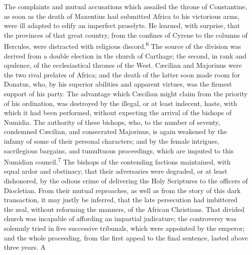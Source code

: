 

The complaints and mutual accusations which assailed the throne
of Constantine, as soon as the death of Maxentius had submitted
Africa to his victorious arms, were ill adapted to edify an
imperfect proselyte. He learned, with surprise, that the
provinces of that great country, from the confines of Cyrene to
the columns of Hercules, were distracted with religious discord.\textsuperscript{6}
The source of the division was derived from a double election
in the church of Carthage; the second, in rank and opulence, of
the ecclesiastical thrones of the West. Cæcilian and Majorinus
were the two rival prelates of Africa; and the death of the
latter soon made room for Donatus, who, by his superior abilities
and apparent virtues, was the firmest support of his party. The
advantage which Cæcilian might claim from the priority of his
ordination, was destroyed by the illegal, or at least indecent,
haste, with which it had been performed, without expecting the
arrival of the bishops of Numidia. The authority of these
bishops, who, to the number of seventy, condemned Cæcilian, and
consecrated Majorinus, is again weakened by the infamy of some of
their personal characters; and by the female intrigues,
sacrilegious bargains, and tumultuous proceedings, which are
imputed to this Numidian council.\textsuperscript{7} The bishops of the contending
factions maintained, with equal ardor and obstinacy, that their
adversaries were degraded, or at least dishonored, by the odious
crime of delivering the Holy Scriptures to the officers of
Diocletian. From their mutual reproaches, as well as from the
story of this dark transaction, it may justly be inferred, that
the late persecution had imbittered the zeal, without reforming
the manners, of the African Christians. That divided church was
incapable of affording an impartial judicature; the controversy
was solemnly tried in five successive tribunals, which were
appointed by the emperor; and the whole proceeding, from the
first appeal to the final sentence, lasted above three years. A
